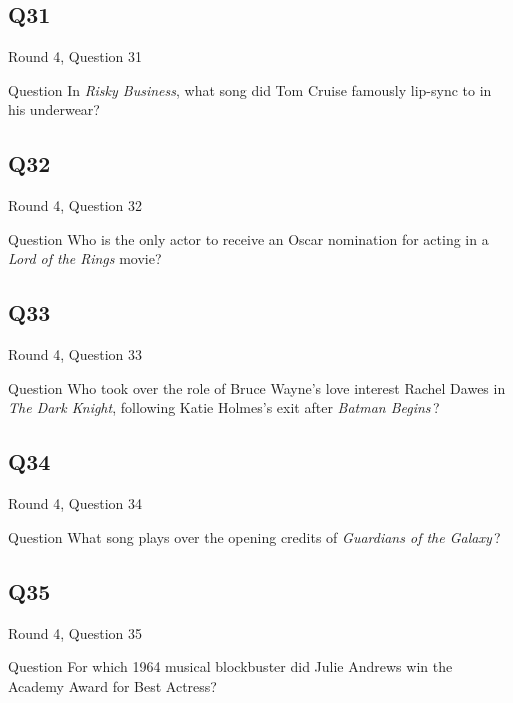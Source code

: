 \documentclass[11pt]{beamer}
\begin{document}
\subsection*{Q31}
\begin{frame}[t]{Round 4, Question 31}
  \vspace{2em}
  \begin{block}{Question}
    In \emph{Risky Business}, what song did Tom Cruise famously lip-sync to in his underwear?
  \end{block}
\end{frame}


\subsection*{Q32}
\begin{frame}[t]{Round 4, Question 32}
  \vspace{2em}
  \begin{block}{Question}
    Who is the only actor to receive an Oscar nomination for acting in a \emph{Lord of the Rings} movie?
  \end{block}
\end{frame}


\subsection*{Q33}
\begin{frame}[t]{Round 4, Question 33}
  \vspace{2em}
  \begin{block}{Question}
    Who took over the role of Bruce Wayne's love interest Rachel Dawes in \emph{The Dark Knight}, following Katie Holmes's exit after \emph{Batman Begins}\,?
  \end{block}
\end{frame}


\subsection*{Q34}
\begin{frame}[t]{Round 4, Question 34}
  \vspace{2em}
  \begin{block}{Question}
    What song plays over the opening credits of \emph{Guardians of the Galaxy}\,?
  \end{block}
\end{frame}


\subsection*{Q35}
\begin{frame}[t]{Round 4, Question 35}
  \vspace{2em}
  \begin{block}{Question}
    For which 1964 musical blockbuster did Julie Andrews win the Academy Award for Best Actress?
  \end{block}
\end{frame}
\end{document}
